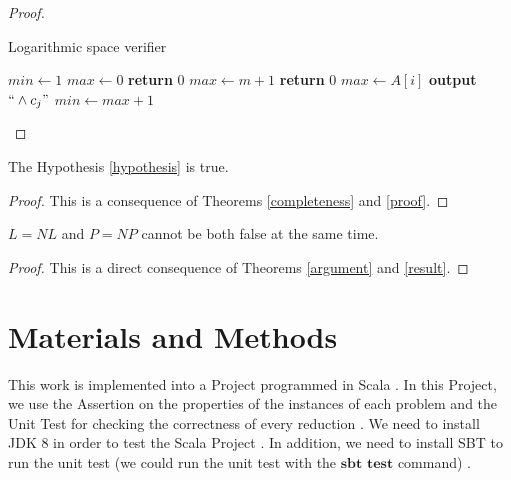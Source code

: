 \documentclass[a4paper,UKenglish,cleveref, autoref]{lipics-v2019}
\begin{document}
\begin{proof}
\begin{algorithm}
\caption{Logarithmic space verifier}\label{2-algorithm}
\begin{algorithmic}[1]
\State $min \gets 1$
\State $max \gets 0$
\State \textbf{return} $0$
\EndIf
{}
\State $max \gets m + 1$
\State \textbf{return} $0$
\Else
\State $max \gets A[i]$
\EndIf
{}
\State \textbf{output} $``\wedge c_{j}"$
\EndFor
\State $min \gets max + 1$
\EndFor
\EndProcedure
\end{algorithmic}
\end{algorithm}
\end{proof}

\begin{theorem}
\label{result}
The Hypothesis \ref{hypothesis} is true.
\end{theorem}

\begin{proof}
This is a consequence of Theorems \ref{completeness} and \ref{proof}.
\end{proof}

\begin{theorem}
$L = NL$ and $P = NP$ cannot be both false at the same time.
\end{theorem}

\begin{proof}
This is a direct consequence of Theorems \ref{argument} and \ref{result}.
\end{proof}


\section{Materials and Methods}

This work is implemented into a Project programmed in Scala \cite{FV19}. In this Project, we use the Assertion on the properties of the instances of each problem and the Unit Test for checking the correctness of every reduction \cite{FV19}. We need to install JDK 8 in order to test the Scala Project \cite{OD16}. In addition, we need to install SBT to run the unit test (we could run the unit test with the $\textbf{sbt test}$ command) \cite{OD16}.


\end{document}
